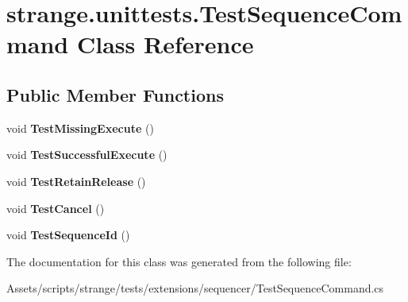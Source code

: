\hypertarget{classstrange_1_1unittests_1_1_test_sequence_command}{\section{strange.\-unittests.\-Test\-Sequence\-Command Class Reference}
\label{classstrange_1_1unittests_1_1_test_sequence_command}
}
\subsection*{Public Member Functions}
\begin{DoxyCompactItemize}
\item 
\hypertarget{classstrange_1_1unittests_1_1_test_sequence_command_a826599b97594702465066fb05e01fcd1}{void {\bfseries Test\-Missing\-Execute} ()}\label{classstrange_1_1unittests_1_1_test_sequence_command_a826599b97594702465066fb05e01fcd1}

\item 
\hypertarget{classstrange_1_1unittests_1_1_test_sequence_command_a55d8ded5eb253080ba581beb4b03b449}{void {\bfseries Test\-Successful\-Execute} ()}\label{classstrange_1_1unittests_1_1_test_sequence_command_a55d8ded5eb253080ba581beb4b03b449}

\item 
\hypertarget{classstrange_1_1unittests_1_1_test_sequence_command_a00296442b91a0586755900740a58a92a}{void {\bfseries Test\-Retain\-Release} ()}\label{classstrange_1_1unittests_1_1_test_sequence_command_a00296442b91a0586755900740a58a92a}

\item 
\hypertarget{classstrange_1_1unittests_1_1_test_sequence_command_aaa3fe25f76b836afaa6d1426e6f25ee0}{void {\bfseries Test\-Cancel} ()}\label{classstrange_1_1unittests_1_1_test_sequence_command_aaa3fe25f76b836afaa6d1426e6f25ee0}

\item 
\hypertarget{classstrange_1_1unittests_1_1_test_sequence_command_a90f39312bbaf40b85fcdf0e1bad69275}{void {\bfseries Test\-Sequence\-Id} ()}\label{classstrange_1_1unittests_1_1_test_sequence_command_a90f39312bbaf40b85fcdf0e1bad69275}

\end{DoxyCompactItemize}


The documentation for this class was generated from the following file\-:\begin{DoxyCompactItemize}
\item 
Assets/scripts/strange/tests/extensions/sequencer/Test\-Sequence\-Command.\-cs\end{DoxyCompactItemize}
